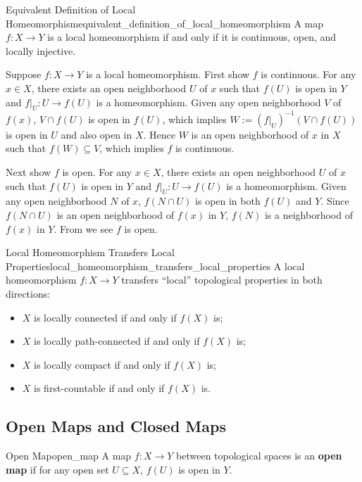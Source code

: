 \documentclass{report}
\begin{document}
\begin{proposition}{Equivalent Definition of Local Homeomorphism}{equivalent_definition_of_local_homeomorphism}
	A map $f:X\to Y$ is a local homeomorphism if and only if it is continuous, open, and locally injective.
\end{proposition}
\begin{prf}
	Suppose $f:X\to Y$ is a local homeomorphism. First show 
	$f$ is continuous. For any $x\in X$, there exists an open neighborhood $U$ of $x$ such that $f(U)$ is open in $Y$ and $f|_U:U\to f(U)$ is a homeomorphism. Given any open neighborhood $V$ of $f(x)$, $V\cap f(U)$ is open in $f(U)$, which implies $W:=(f|_U)^{-1}(V\cap f(U))$ is open in $U$ and also open in $X$. Hence $W$ is an open neighborhood of $x$ in $X$ such that $f(W)\subseteq V$, which implies $f$ is continuous.

	Next show $f$ is open. For any $x\in X$, there exists an open neighborhood $U$ of $x$ such that $f(U)$ is open in $Y$ and $f|_U:U\to f(U)$ is a homeomorphism. Given any open neighborhood $N$ of $x$, $f(N \cap U)$ is open in both $f(U)$ and $Y$. Since $f(N\cap U)$ is an open neighborhood of $f(x)$ in $Y$, $f(N)$ is a neighborhood of $f(x)$ in $Y$. From  we see $f$ is open.
\end{prf}

\begin{proposition}{Local Homeomorphism Transfers Local Properties}{local_homeomorphism_transfers_local_properties}
	A local homeomorphism $f: X \rightarrow Y$ transfers ``local'' topological properties in both directions:
	\begin{itemize}
		\item $X$ is locally connected if and only if $f(X)$ is;
		\item  $X$ is locally path-connected if and only if $f(X)$ is;
		\item  $X$ is locally compact if and only if $f(X)$ is;
		\item  $X$ is first-countable if and only if $f(X)$ is.
	\end{itemize}
\end{proposition}


\subsection{Open Maps and Closed Maps}

\begin{definition}{Open Map}{open_map}
	A map $f:X\to Y$ between topological spaces is an \textbf{open map} if for any open set $U\subseteq X$, $f(U)$ is open in $Y$.
\end{definition}
\end{document}
